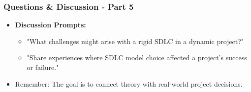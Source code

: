 \documentclass{beamer}
\begin{document}
\begin{frame}[fragile]
  \frametitle{Questions \& Discussion - Part 5}
  \begin{itemize}
    \item \textbf{Discussion Prompts:} 
    \begin{itemize}
      \item "What challenges might arise with a rigid SDLC in a dynamic project?"
      \item "Share experiences where SDLC model choice affected a project’s success or failure."
    \end{itemize}
    \item Remember: The goal is to connect theory with real-world project decisions.
  \end{itemize}
\end{frame}
\end{document}
